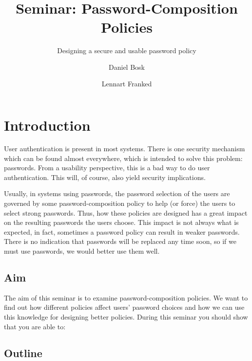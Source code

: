 \title{Seminar: Password-Composition Policies}
\subtitle{Designing a secure and usable password policy}

\author{%
  Daniel Bosk
  \and
  Lennart Franked
}

\maketitle

\begin{abstract}
  
\end{abstract}

\section{Introduction}
\label{sec:intro}
User authentication is present in most systems.
There is one security mechanism which can be found almost everywhere, which is 
intended to solve this problem: passwords.
From a usability perspective, this is a bad way to do user authentication.
This will, of course, also yield security implications.

Usually, in systems using passwords, the password selection of the users are 
governed by some password-composition policy to help (or force) the users to 
select strong passwords.
Thus, how these policies are designed has a great impact on the resulting 
passwords the users choose.
This impact is not always what is expected, in fact, sometimes a password 
policy can result in weaker passwords.
There is no indication that passwords will be replaced any time soon, so if we 
must use passwords, we would better use them well.

\subsection{Aim}
\label{sec:Syfte}
The aim of this seminar is to examine password-composition policies.
We want to find out how different policies affect users' password choices and 
how we can use this knowledge for designing better policies.
During this seminar you should show that you are able to:
\begin{itemize}
	
\end{itemize}

\subsection{Outline}

